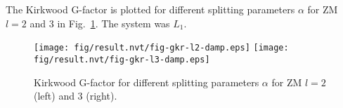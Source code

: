 \documentclass[aip,jcp,a4paper,preprint,unsortedaddress,onecolumn,fleqn]{revtex4-1}
\begin{document}
The Kirkwood G-factor is plotted for different splitting parameters $\alpha$ for ZM $l=2$ and 3 in Fig.~\ref{fig:damp-gkr-l23}. 
The system was $L_1$.
\begin{figure}[]
  \centering
  \texttt{[image: fig/result.nvt/fig-gkr-l2-damp.eps]}
  \texttt{[image: fig/result.nvt/fig-gkr-l3-damp.eps]}
  \caption{Kirkwood G-factor for different splitting parameters $\alpha$ for ZM $l=2$ (left) and 3 (right).}
  \label{fig:damp-gkr-l23}
\end{figure}




\newpage
{}

\end{document}
